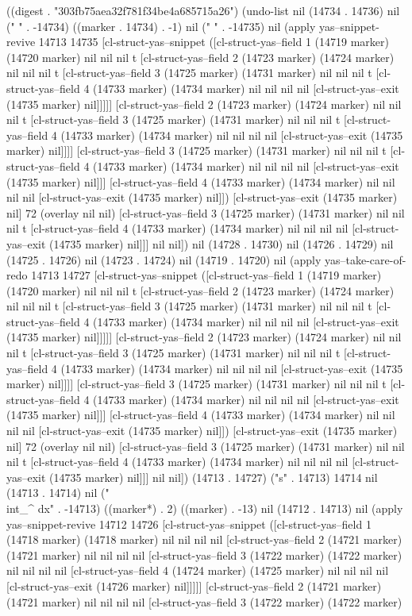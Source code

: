 
((digest . "303fb75aea32f781f34be4a685715a26") (undo-list nil (14734 . 14736) nil (" " . -14734) ((marker . 14734) . -1) nil (" " . -14735) nil (apply yas--snippet-revive 14713 14735 [cl-struct-yas--snippet ([cl-struct-yas--field 1 (14719 marker) (14720 marker) nil nil nil t [cl-struct-yas--field 2 (14723 marker) (14724 marker) nil nil nil t [cl-struct-yas--field 3 (14725 marker) (14731 marker) nil nil nil t [cl-struct-yas--field 4 (14733 marker) (14734 marker) nil nil nil nil [cl-struct-yas--exit (14735 marker) nil]]]]] [cl-struct-yas--field 2 (14723 marker) (14724 marker) nil nil nil t [cl-struct-yas--field 3 (14725 marker) (14731 marker) nil nil nil t [cl-struct-yas--field 4 (14733 marker) (14734 marker) nil nil nil nil [cl-struct-yas--exit (14735 marker) nil]]]] [cl-struct-yas--field 3 (14725 marker) (14731 marker) nil nil nil t [cl-struct-yas--field 4 (14733 marker) (14734 marker) nil nil nil nil [cl-struct-yas--exit (14735 marker) nil]]] [cl-struct-yas--field 4 (14733 marker) (14734 marker) nil nil nil nil [cl-struct-yas--exit (14735 marker) nil]]) [cl-struct-yas--exit (14735 marker) nil] 72 (overlay nil nil) [cl-struct-yas--field 3 (14725 marker) (14731 marker) nil nil nil t [cl-struct-yas--field 4 (14733 marker) (14734 marker) nil nil nil nil [cl-struct-yas--exit (14735 marker) nil]]] nil nil]) nil (14728 . 14730) nil (14726 . 14729) nil (14725 . 14726) nil (14723 . 14724) nil (14719 . 14720) nil (apply yas--take-care-of-redo 14713 14727 [cl-struct-yas--snippet ([cl-struct-yas--field 1 (14719 marker) (14720 marker) nil nil nil t [cl-struct-yas--field 2 (14723 marker) (14724 marker) nil nil nil t [cl-struct-yas--field 3 (14725 marker) (14731 marker) nil nil nil t [cl-struct-yas--field 4 (14733 marker) (14734 marker) nil nil nil nil [cl-struct-yas--exit (14735 marker) nil]]]]] [cl-struct-yas--field 2 (14723 marker) (14724 marker) nil nil nil t [cl-struct-yas--field 3 (14725 marker) (14731 marker) nil nil nil t [cl-struct-yas--field 4 (14733 marker) (14734 marker) nil nil nil nil [cl-struct-yas--exit (14735 marker) nil]]]] [cl-struct-yas--field 3 (14725 marker) (14731 marker) nil nil nil t [cl-struct-yas--field 4 (14733 marker) (14734 marker) nil nil nil nil [cl-struct-yas--exit (14735 marker) nil]]] [cl-struct-yas--field 4 (14733 marker) (14734 marker) nil nil nil nil [cl-struct-yas--exit (14735 marker) nil]]) [cl-struct-yas--exit (14735 marker) nil] 72 (overlay nil nil) [cl-struct-yas--field 3 (14725 marker) (14731 marker) nil nil nil t [cl-struct-yas--field 4 (14733 marker) (14734 marker) nil nil nil nil [cl-struct-yas--exit (14735 marker) nil]]] nil nil]) (14713 . 14727) ("s" . 14713) 14714 nil (14713 . 14714) nil ("\\int_{}^{} dx" . -14713) ((marker*) . 2) ((marker) . -13) nil (14712 . 14713) nil (apply yas--snippet-revive 14712 14726 [cl-struct-yas--snippet ([cl-struct-yas--field 1 (14718 marker) (14718 marker) nil nil nil nil [cl-struct-yas--field 2 (14721 marker) (14721 marker) nil nil nil nil [cl-struct-yas--field 3 (14722 marker) (14722 marker) nil nil nil nil [cl-struct-yas--field 4 (14724 marker) (14725 marker) nil nil nil nil [cl-struct-yas--exit (14726 marker) nil]]]]] [cl-struct-yas--field 2 (14721 marker) (14721 marker) nil nil nil nil [cl-struct-yas--field 3 (14722 marker) (14722 marker) 